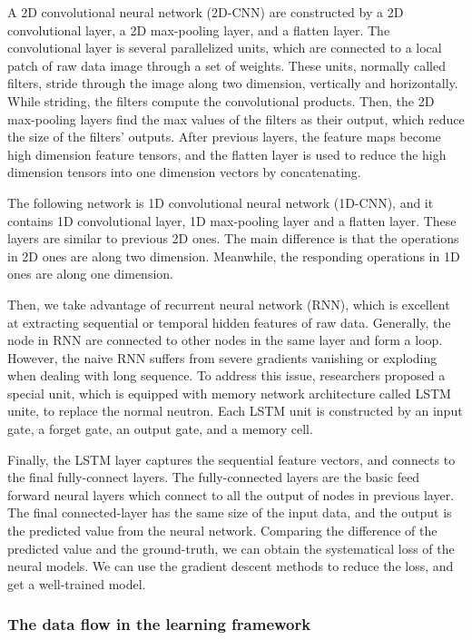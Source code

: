 \documentclass[10pt,conference,letterpaper]{IEEEtran}
\begin{document}
A 2D convolutional neural network (2D-CNN) are constructed by a 2D convolutional layer, a 2D max-pooling layer, and a flatten layer. The convolutional layer is several parallelized units, which are connected to a local patch of raw data image through a set of weights. These units, normally called filters, stride through the image along two dimension, vertically and horizontally. While striding, the filters compute the convolutional products. Then, the 2D max-pooling layers find the max values of the filters as their output, which reduce the size of the filters' outputs. After previous layers, the feature maps become high dimension feature tensors, and the flatten layer is used to reduce the high dimension tensors into one dimension vectors by concatenating. 

The following network is 1D convolutional neural network (1D-CNN), and it contains 1D convolutional layer, 1D max-pooling layer and a flatten layer. These layers are similar to previous 2D ones. The main difference is that the operations in 2D ones are along two dimension. Meanwhile, the responding operations in 1D ones are along one dimension.

Then, we take advantage of recurrent neural network (RNN), which is excellent at extracting sequential or temporal hidden features of raw data. Generally, the node in RNN are connected to other nodes in the same layer and form a loop. However, the naive RNN suffers from severe gradients vanishing or exploding when dealing with long sequence. To address this issue, researchers proposed a special unit, which is equipped with memory network architecture called LSTM unite, to replace the normal neutron. Each LSTM unit is constructed by an input gate, a forget gate, an output gate, and a memory cell. 

Finally, the LSTM layer captures the sequential feature vectors, and connects to the final fully-connect layers. The fully-connected layers are the basic feed forward neural layers which connect to all the output of nodes in previous layer. The final connected-layer has the same size of the input data, and the output is the predicted value from the neural network. Comparing the difference of the predicted value and the ground-truth, we can obtain the systematical loss of the neural models. We can use the gradient descent methods to reduce the loss, and get a well-trained model.

\subsubsection{The data flow in the learning framework}
\end{document}
